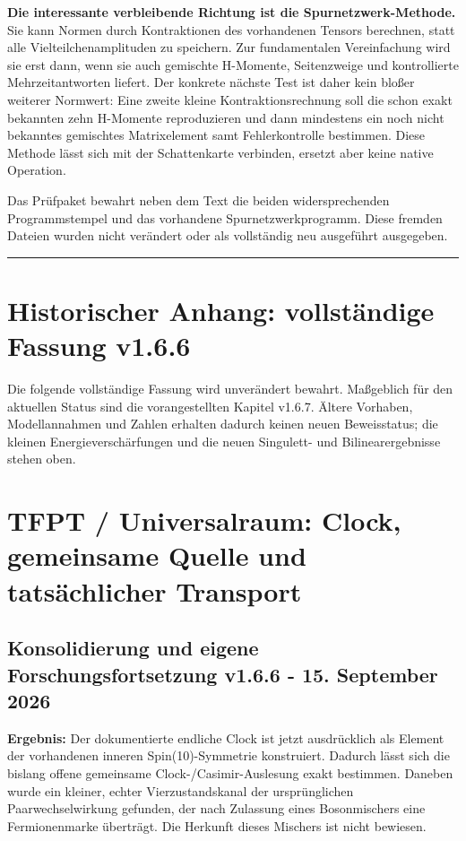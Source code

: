 \textbf{Die interessante verbleibende Richtung ist die
Spurnetzwerk-Methode.} Sie kann Normen durch Kontraktionen des
vorhandenen Tensors berechnen, statt alle Vielteilchenamplituden zu
speichern. Zur fundamentalen Vereinfachung wird sie erst dann, wenn sie
auch gemischte H-Momente, Seitenzweige und kontrollierte
Mehrzeitantworten liefert. Der konkrete nächste Test ist daher kein
bloßer weiterer Normwert: Eine zweite kleine Kontraktionsrechnung soll
die schon exakt bekannten zehn H-Momente reproduzieren und dann
mindestens ein noch nicht bekanntes gemischtes Matrixelement samt
Fehlerkontrolle bestimmen. Diese Methode lässt sich mit der
Schattenkarte verbinden, ersetzt aber keine native Operation.

Das Prüfpaket bewahrt neben dem Text die beiden widersprechenden
Programmstempel und das vorhandene Spurnetzwerkprogramm. Diese fremden
Dateien wurden nicht verändert oder als vollständig neu ausgeführt
ausgegeben.

\begin{center}\rule{0.5\linewidth}{0.5pt}\end{center}

\section{Historischer Anhang: vollständige Fassung
v1.6.6}\label{historischer-anhang-vollstuxe4ndige-fassung-v1.6.6}

Die folgende vollständige Fassung wird unverändert bewahrt. Maßgeblich
für den aktuellen Status sind die vorangestellten Kapitel v1.6.7. Ältere
Vorhaben, Modellannahmen und Zahlen erhalten dadurch keinen neuen
Beweisstatus; die kleinen Energieverschärfungen und die neuen Singulett-
und Bilinearergebnisse stehen oben.

\section{TFPT / Universalraum: Clock, gemeinsame Quelle und
tatsächlicher
Transport}\label{tfpt-universalraum-clock-gemeinsame-quelle-und-tatsuxe4chlicher-transport}

\subsection{Konsolidierung und eigene Forschungsfortsetzung v1.6.6 - 15.
September
2026}\label{konsolidierung-und-eigene-forschungsfortsetzung-v1.6.6---15.-september-2026}

\textbf{Ergebnis:} Der dokumentierte endliche Clock ist jetzt
ausdrücklich als Element der vorhandenen inneren Spin(10)-Symmetrie
konstruiert. Dadurch lässt sich die bislang offene gemeinsame
Clock-/Casimir-Auslesung exakt bestimmen. Daneben wurde ein kleiner,
echter Vierzustandskanal der ursprünglichen Paarwechselwirkung gefunden,
der nach Zulassung eines Bosonmischers eine Fermionenmarke überträgt.
Die Herkunft dieses Mischers ist nicht bewiesen.

